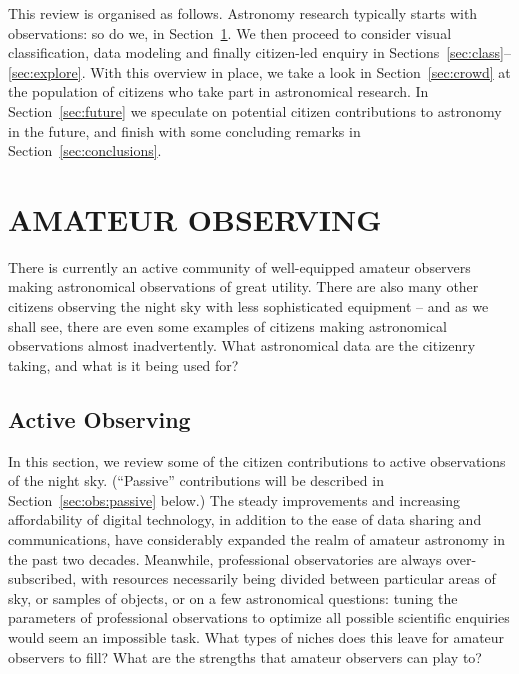 \documentclass{ar2e}
\def\Sref#1{Section~\ref{#1}\xspace}
\begin{document}
This review is organised as follows. Astronomy research typically starts with
observations: so do we, in \Sref{sec:obs}. We then proceed to consider visual
classification, data modeling and finally citizen-led enquiry in 
Sections~\ref{sec:class}--\ref{sec:explore}. With this overview in place, we
take a look in \Sref{sec:crowd} at the population of citizens who take part in
astronomical research. 
In \Sref{sec:future} we speculate on potential citizen contributions to
astronomy in the future, and finish with some
concluding remarks in \Sref{sec:conclusions}.



\section{AMATEUR OBSERVING}
\label{sec:obs}

There is currently an active community of well-equipped amateur observers making
astronomical observations of great utility. There are also many other citizens
observing the night sky with less sophisticated equipment -- and as we shall
see, there are even some examples of citizens making astronomical observations
almost inadvertently. What astronomical data are the citizenry taking, and what
is it being used for?



\subsection{Active Observing}
\label{sec:obs:active}

In this section, we review some of the citizen contributions to active
observations of the night sky.  (``Passive'' contributions  will be described in
\Sref{sec:obs:passive} below.) The steady improvements and increasing
affordability of digital technology, in addition to the ease of data sharing and
communications, have considerably expanded the realm of amateur astronomy in the
past two decades.  Meanwhile, professional observatories are always
over-subscribed, with resources necessarily being divided between particular
areas of sky, or samples of objects, or on a few astronomical questions: tuning
the parameters of professional observations to optimize all possible scientific
enquiries would seem an impossible task. What types of  niches does this leave
for amateur observers to fill? What are the strengths that amateur observers can
play to?
\end{document}
